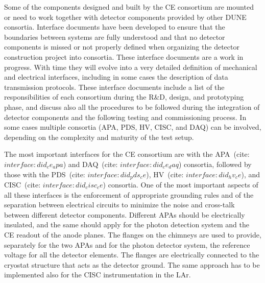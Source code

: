 
Some of the components designed and built by the CE consortium are
mounted or need to work together with detector components provided by other DUNE
consortia. Interface documents have been developed to ensure that the boundaries
between systems are fully understood and that no detector components is missed or
not properly defined when organizing the detector construction project into
consortia. These interface documents are a work in progress. With time they will
evolve into a very detailed definition of mechanical and electrical interfaces,
including in some cases the description of data transmission protocols. These
interface documents include a list of the responsibilities of each consortium during the
R\&D, design, and prototyping phase, and discuss also all the procedures to be
followed during the integration of detector components and the following testing
and commissioning process. In some cases multiple consortia (APA, PDS, HV, CISC,
and DAQ) can be involved, depending on the complexity and maturity of the test
setup.

The most important interfaces for the CE consortium are with the APA~(cite: $interface:did_ce_apa$)
and DAQ~(cite: $interface:did_ce_daq$) consortia, followed by those with the
PDS~(cite: $interface:did_pds_ce$), HV~(cite: $interface:did_hv_ce$), and
CISC~(cite: $interface:did_cisc_ce$) consortia. One of the most important aspects
of all these interfaces is the enforcement of appropriate grounding rules and
of the separation between electrical circuits to minimize the noise and cross-talk
between different detector components. Different APAs should be electrically
insulated, and the same should apply for the photon detection system and the
CE readout of the anode planes. The flanges on the chimneys are used to provide,
separately for the two APAs and for the photon detector system, the reference
voltage for all the detector elements. The flanges are electrically connected
to the cryostat structure that acts as the detector ground. The same approach
has to be implemented also for the CISC instrumentation in the LAr.

